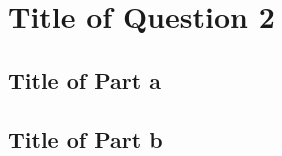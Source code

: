 \section{Title of Question 2}\label{sec:q2}

\subsection{Title of Part a}\label{sec:q2a}



\subsection{Title of Part b}\label{sec:q2b}


